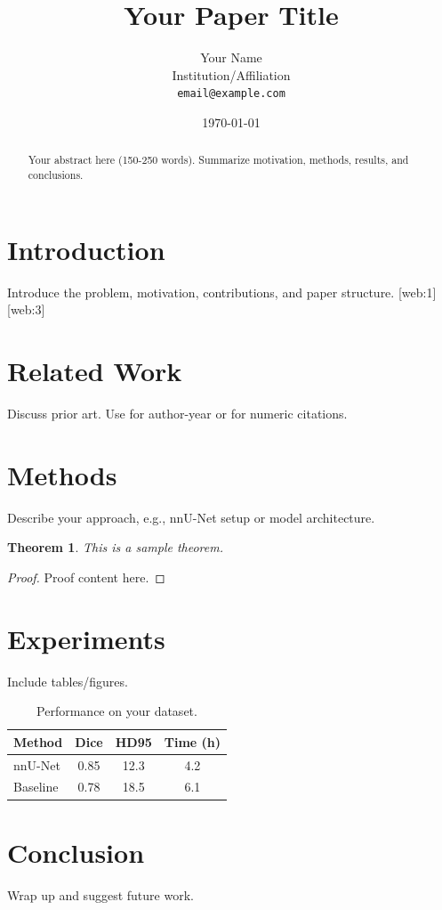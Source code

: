\documentclass[12pt,longbibliography]{article}
\title{Your Paper Title}
\author{Your Name \\ 
Institution/Affiliation \\
\texttt{email@example.com}}
\date{\today}  %
\newtheorem{theorem}{Theorem}[section]
\theoremstyle{definition}
\theoremstyle{remark}
\begin{document}
\maketitle

\begin{abstract}
Your abstract here (150-250 words). Summarize motivation, methods, results, and conclusions.
\end{abstract}

\section{Introduction}
Introduce the problem, motivation, contributions, and paper structure. [web:1][web:3]

\section{Related Work}
Discuss prior art. Use \citet{key} for author-year or \citep{key} for numeric citations.

\section{Methods}
Describe your approach, e.g., nnU-Net setup or model architecture.

\begin{theorem}
This is a sample theorem.
\end{theorem}
\begin{proof}
Proof content here.
\end{proof}

\section{Experiments}
Include tables/figures.

\begin{table}[h]
\centering
\begin{tabular}{lccc}
\hline
Method & Dice & HD95 & Time (h) \\
\hline
nnU-Net & 0.85 & 12.3 & 4.2 \\
Baseline & 0.78 & 18.5 & 6.1 \\
\hline
\end{tabular}
\caption{Performance on your dataset.}
\label{tab:results}
\end{table}

\section{Conclusion}
Wrap up and suggest future work.


\end{document}
